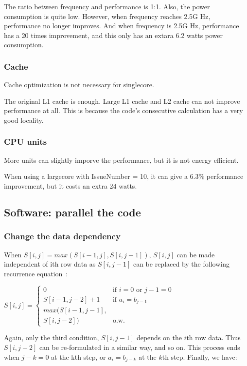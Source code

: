 \documentclass[twocolumn,letterpaper,10pt]{article}
\begin{document}
The ratio between frequency and performance is 1:1. Also, the power consumption is quite low. However, when frequency reaches 2.5G Hz, performance no longer improves. And when frequency is 2.5G Hz, performance has a 20 times improvement, and this only has an extara 6.2 watts power consumption.

\subsubsection{Cache}

Cache optimization is not necessary for singlecore.

The original L1 cache is enough. Large L1 cache and L2 cache can not improve performance at all. This is because the code's consecutive calculation has a very good locality.

\subsubsection{CPU units}

More units can slightly imporve the performance, but it is not energy efficient.

When using a largecore with IssueNumber = 10, it can give a 6.3\% performance improvement, but it costs an extra 24 watts.

\subsection{Software: parallel the code}

\subsubsection{Change the data dependency}

When $S[i,j]=max(S[i-1,j],S[i,j-1]) $, $ S[i,j] $ can be made independent of ith row data as $ S[i,j-1] $ can be replaced by the following recurrence equation~\cite{parallel}:

$ S[i,j] =
\begin{cases}
 0 & \text{if }i=0\text{ or }j-1=0 \\
 S[i-1,j-2]+1 & \text{if }a_i=b_{j-1} \\
 max(S[i-1,j-1], \\ S[i,j-2]) & \text{o.w.}
\end{cases} $

Again, only the third condition, $ S[i,j-1] $ depends on the $i$th row data. Thus $ S[i,j-2] $ can be re-formulated in a similar way, and so on. This process ends when $ j-k=0 $ at the kth step, or $ a_i=b_{j-k} $ at the $k$th step. Finally, we have:
\end{document}
